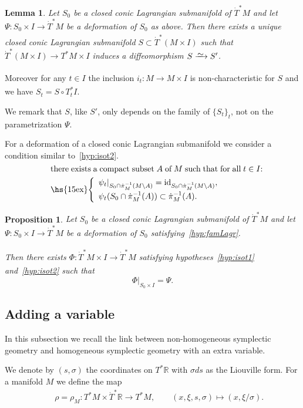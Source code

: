 \documentclass[12pt,leqno]{article}
\newtheorem{proposition}[theorem]{Proposition}
\newtheorem{lemma}[theorem]{Lemma}
\theoremstyle{definition}
\newcommand{\R}{{\mathbb{R}}}
\renewcommand{\to}[1][]{\xrightarrow[]{#1}}
\newcommand{\isoto}[1][]{\xrightarrow[#1]%
{{\raisebox{-.6ex}[0ex][-.6ex]{$\mspace{1mu}\sim\mspace{2mu}$}}}}
\newcommand{\conv}[1][]{\mathop{\circ}\limits_{#1}}
\newcommand{\opb}[1]{#1^{-1}}
\newcommand{\cl}{\colon}
\newcommand{\ba}{\begin{array}}
\newcommand{\ea}{\end{array}}
\newcommand{\eq}{\begin{eqnarray}}
\newcommand{\eneq}{\end{eqnarray}}
\newcommand{\eqn}{\begin{eqnarray*}}
\newcommand{\eneqn}{\end{eqnarray*}}
\DeclareMathOperator{\id}{id}
\newcommand{\dT}{{\dot{T}}}
\newcommand{\dTM}{{\dT}^*M}
\numberwithin{equation}{section}
\begin{document}
\begin{lemma}\label{lem:family-Lagr}
Let $S_0$ be a closed conic Lagrangian submanifold of $\dTM$ and
let $\Psi\cl S_0\times I \to \dTM$ be a deformation of $S_0$ as above.
Then there exists a unique closed conic Lagrangian submanifold
$S\subset \dT^*(M\times I)$ such that 
$\dT^*(M\times I)\to T^*M\times I$ induces a diffeomorphism
$S\isoto S'$.
\end{lemma}

Moreover for any $t\in I$ the inclusion $i_t\cl M \to M\times I$ is
non-characteristic for ${S}$  and we have $S_{t} = S\conv T^*_{t}I$.

We remark that $S$, like $S'$, only depends on the family of $\{S_t\}_t$, not
on the parametrization $\Psi$.

For a deformation of a closed conic Lagrangian submanifold we consider a
condition similar to~\eqref{hyp:isot2}.
\eq\label{hyp:famLagr}
&&\parbox{60ex}{
there exists a compact subset $A$ of $M$ such that for all $t\in I$: \\[1ex]
\hs{15ex}$\left\{\ba{l}
\psi_t|_{S_0 \cap \opb{\dot\pi_M}(M\setminus A)}
= \id_{S_0 \cap \opb{\dot\pi_M}(M\setminus A)}, \\[1ex]
\psi_t(S_0 \cap \opb{\dot\pi_M}(A)) \subset \opb{\dot\pi_M}(A).
\ea\right.$}
\eneq


\begin{proposition}\label{prop:extending-isotopies}
Let $S_0$ be a closed conic Lagrangian submanifold of $\dTM$ and
let $\Psi\cl S_0\times I \to \dTM$ be a deformation of $S_0$
satisfying~\eqref{hyp:famLagr}.

Then there exists $\Phi\cl \dTM\times I\to \dTM$ satisfying
hypotheses~\eqref{hyp:isot1} and~\eqref{hyp:isot2} such that
$$
\Phi|_{S_0 \times I} = \Psi.
$$  
\end{proposition}


\subsection{Adding a variable}\label{sec:adding}
In this subsection we recall the link between non-homogeneous symplectic
geometry and homogeneous symplectic geometry with an extra variable.



We denote by $(s,\sigma)$ the coordinates on $T^*\R$ 
with $\sigma ds$ as the Liouville form.
For a manifold $M$  we define the map
\eqn
&&\rho=\rho_M\cl T^*M\times\dT^*\R\to T^*M,
\qquad (x,\xi,s,\sigma) \mapsto (x,\xi/\sigma).
\eneqn
\end{document}
